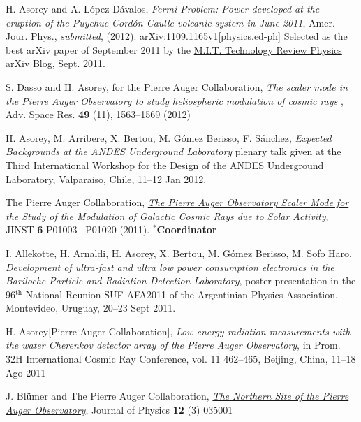 \documentclass[11pt, a4paper]{article}
\newcommand{\years}[1]{\marginnote{\scriptsize #1}}
\begin{document}
\begin{etaremune}
\item \years{2012}H. Asorey and A. López Dávalos, {\emph{Fermi Problem: Power
developed at the eruption of the Puyehue-Cordón Caulle volcanic system in June
2011}}, Amer. Jour. Phys., {\emph{submitted}}, (2012).
\href{http://arxiv.org/abs/1109.1165}{arXiv:1109.1165v1}[physics.ed-ph]
Selected as the best arXiv paper of September 2011 by the
\href{http://www.technologyreview.com/blog/arxiv/27140/}{M.I.T. Technology
Review Physics arXiv Blog}, Sept. 2011.

\item \years{2012}S. Dasso and H. Asorey, for the Pierre Auger Collaboration,
\href{http://dx.doi.org/10.1016/j.asr.2011.12.028}{\emph{ The scaler mode in
the Pierre Auger Observatory to study heliospheric modulation of cosmic rays
}}, Adv. Space Res. {\bf{49}} (11), 1563--1569 (2012)

\item \years{2012} H. Asorey, M. Arribere, X. Bertou, M. Gómez Berisso, F. Sánchez,
{\emph{Expected Backgrounds at the ANDES Underground Laboratory}}
plenary talk given at the Third International Workshop for the Design of the
ANDES Underground Laboratory, Valparaiso, Chile, 11--12 Jan 2012.

\item \years{2011}The Pierre Auger Collaboration,
\href{http://dx.doi.org/10.1088/1748-0221/6/01/P01003}{\emph{The Pierre Auger
Observatory Scaler Mode for the Study of the Modulation of Galactic Cosmic Rays
due to Solar Activity}}, JINST {\bf 6} P01003--
P01020 (2011).
$^*${\bf{Coordinator}}

\item \years{2011}I. Allekotte, H. Arnaldi, H. Asorey, X. Bertou, M. Gómez Berisso,
M. Sofo Haro, {\emph{Development of ultra-fast and ultra low power consumption
electronics in the Bariloche Particle and Radiation Detection Laboratory}},
poster presentation in the 96$^{\mathrm{th}}$ National Reunion SUF-AFA2011 of the Argentinian
Physics Association, Montevideo, Uruguay, 20--23 Sept 2011.

\item \years{2011}H. Asorey[Pierre Auger Collaboration], {\emph{Low energy radiation
measurements with the water Cherenkov detector array of the Pierre Auger
Observatory}}, in Prom. 32H International Cosmic Ray Conference, vol. 11
462--465, Beijing, China, 11--18 Ago 2011

\item \years{2010}J. Bl\"umer and The Pierre Auger Collaboration,
\href{http://dx.doi.org/10.1088/1367-2630/12/3/035001}{\emph{The Northern Site
of the Pierre Auger Observatory}}, Journal of Physics {\bf 12} (3) 035001


\end{etaremune}
\end{document}
